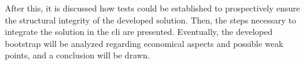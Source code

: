 After this, it is discussed how tests could be established to prospectively ensure the structural integrity of the developed solution.
Then, the steps necessary to integrate the solution in the \ac{cli} are presented.
Eventually, the developed bootstrap will be analyzed regarding economical aspects and possible weak points, and a conclusion will be drawn.